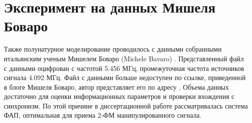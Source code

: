 %
%
%


\section{Эксперимент на данных Мишеля Боваро}

Также полунатурное моделирование проводилось с данными собранными итальянским ученым Мишелем Боваро (Michele Bavaro) \cite{bovaro_blog}. Представленный файл с данными оцифрован
с частотой 5.456 МГц, промежуточная частота источников сигнала 4.092 МГц. Файл с данными больше недоступен по ссылке, приведенной в блоге Мишеля Боваро,
автор представляет его по адресу \cite{rflab_primo}.
Объема данных достаточно для оценки информационных параметров и проверки вхождения с синхронизм. По этой причине в диссертационной работе
рассматривалась система ФАП, оптимальная для приема 2-ФМ манипулированного сигнала.

